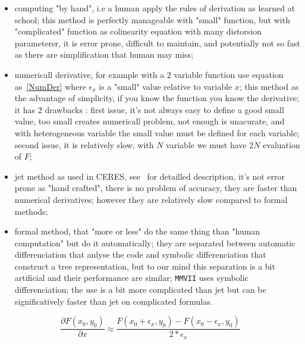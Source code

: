 \begin{itemize}
    \item  computing "by hand", i.e a human apply the rules of derivation as
           learned at school;  this method is perfectly manageable with "small"
           function, but with "complicated" function as colinearity equation with many distorsion parametersr,
           it is error prone, difficult to maintain, and potentially not so fast as there
           are simplification that human may miss;

    \item  numericall derivative, for example with a $2$ variable function use equation as~\ref{NumDer}
           where $\epsilon_x$ is a "small" value relative to variable $x$;
           this method as the advantage of simplicity, if you know the function you know the derivative;
           it has $2$ drawbacks :  first issue, it's not always easy to define a good small value,  too small
           creates numericall problem, not enough is unacurate, and with heterogeneous variable the small
            value must be defined for each variable;  second issue, it is relatively slow, with $N$  variable
           we must have $2N$ evaluation of $F$;

     \item jet method as used in CERES, see~\cite{CERES} for detailled description, it's not error
           prone as "hand crafted", there is no problem of accuracy, they are faster than 
           numerical derivatives; however they are relatively slow compared to formal methods;

     \item formal method, that "more or less" do the same thing than "human computation" but do
           it automatically; they are separated between automatic differenciation that anlyse the code
           and symbolic differenciation that construct a tree representation, but to our mind this separation
           is a bit artificial and their performance are similar;  {\tt MMVII} uses symbolic differenciation;
           the use is a bit more complicated than jet but can be significatively faster  than jet on complicated
           formulas.
\end{itemize}

\begin{equation}
    \frac{\partial F(x_0,y_0)}{\partial x} \approx \frac{F(x_0 + \epsilon_x,y_0) - F(x_0-\epsilon_x,y_0)}{2* \epsilon_x}
     \label{NumDer}
\end{equation}

